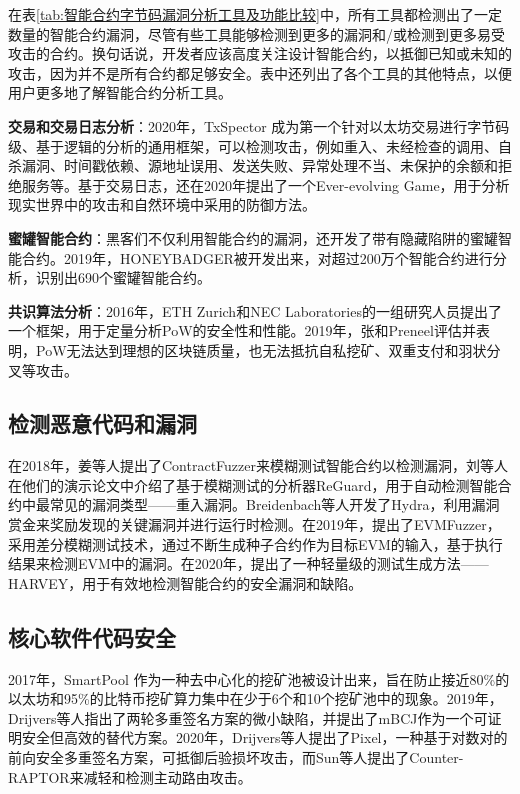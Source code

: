 \begin{translation}
在表\ref{tab:智能合约字节码漏洞分析工具及功能比较}中，所有工具都检测出了一定数量的智能合约漏洞，尽管有些工具能够检测到更多的漏洞和/或检测到更多易受攻击的合约。换句话说，开发者应该高度关注设计智能合约，以抵御已知或未知的攻击，因为并不是所有合约都足够安全。表中还列出了各个工具的其他特点，以便用户更多地了解智能合约分析工具。

\textbf{交易和交易日志分析}：2020年，TxSpector\cite{art99} 成为第一个针对以太坊交易进行字节码级、基于逻辑的分析的通用框架，可以检测攻击，例如重入、未经检查的调用、自杀漏洞、时间戳依赖、源地址误用、发送失败、异常处理不当、未保护的余额和拒绝服务等。基于交易日志，还在2020年提出了一个Ever-evolving Game，用于分析现实世界中的攻击和自然环境中采用的防御方法\cite{art100}。

\textbf{蜜罐智能合约}：黑客们不仅利用智能合约的漏洞，还开发了带有隐藏陷阱的蜜罐智能合约。2019年，HONEYBADGER被开发出来，对超过200万个智能合约进行分析，识别出690个蜜罐智能合约\cite{art101}。

\textbf{共识算法分析}：2016年，ETH Zurich和NEC Laboratories的一组研究人员提出了一个框架，用于定量分析PoW的安全性和性能\cite{art102}。2019年，张和Preneel评估并表明，PoW无法达到理想的区块链质量，也无法抵抗自私挖矿、双重支付和羽状分叉等攻击\cite{art103}。

\subsection{检测恶意代码和漏洞}

在2018年，姜等人提出了ContractFuzzer来模糊测试智能合约以检测漏洞\cite{art104}，刘等人在他们的演示论文中介绍了基于模糊测试的分析器ReGuard，用于自动检测智能合约中最常见的漏洞类型——重入漏洞\cite{art105}。Breidenbach等人开发了Hydra，利用漏洞赏金来奖励发现的关键漏洞并进行运行时检测\cite{art87}。在2019年，提出了EVMFuzzer，采用差分模糊测试技术，通过不断生成种子合约作为目标EVM的输入，基于执行结果来检测EVM中的漏洞\cite{art106}。在2020年，提出了一种轻量级的测试生成方法——HARVEY，用于有效地检测智能合约的安全漏洞和缺陷\cite{art107}。

\subsection{核心软件代码安全}

2017年，SmartPool 作为一种去中心化的挖矿池被设计出来，旨在防止接近80\%的以太坊和95\%的比特币挖矿算力集中在少于6个和10个挖矿池中的现象\cite{art108}。2019年，Drijvers等人指出了两轮多重签名方案的微小缺陷，并提出了mBCJ作为一个可证明安全但高效的替代方案\cite{art109}。2020年，Drijvers等人提出了Pixel，一种基于对数对的前向安全多重签名方案，可抵御后验损坏攻击\cite{art110}，而Sun等人提出了Counter-RAPTOR来减轻和检测主动路由攻击\cite{art111}。


\end{translation}

